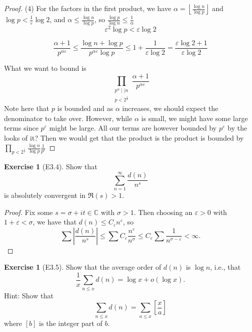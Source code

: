 \documentclass[reqno]{amsart}
\theoremstyle{definition}
\newtheorem{exercise}[theorem]{Exercise}
\theoremstyle{remark}
\begin{document}
\begin{proof}
    (4) For the factors in the first product, we have
    $\alpha = \left\lfloor \frac{\log n}{\log p}
    \right\rfloor$ and
    $\log p < \frac{1}{\varepsilon} \log 2$, and
    $\alpha \le \frac{\log n}{\log p}$, so
    $\frac{\log p}{\log n} \le \frac{1}{\alpha}$
    \[
    \varepsilon^2 \log p < \varepsilon \log 2
    \] 


    \[
        \frac{\alpha+1}{p^{\alpha \varepsilon}}
        \le \frac{\log n +\log p}{p^{\alpha \varepsilon} \log p}
        \le 1 + \frac{1}{\varepsilon \log 2} = 
        \frac{\varepsilon \log 2 + 1}{\varepsilon \log 2}
    \] 

    What we want to bound is
    \[
\prod_{\substack{p^{\alpha} \mid  \mid n \\ p <
    2^{\frac{1}{\varepsilon}}}}
\frac{\alpha+1}{p^{\alpha \varepsilon}}
\] 
Note here that $p$ is bounded and
as $\alpha$ increases, we should expect the denominator to
take over. However, while $\alpha$ is small,
we might have some large terms since $p^{\varepsilon}$ might
be large. All our terms are however bounded by
$p^{\varepsilon}$ by the looks of it? Then we
would get that the product is
the product is bounded by
$\prod_{p < 2^{\frac{1}{\varepsilon}}} 
\frac{\log n}{\log p} \frac{1}{p^{\varepsilon}}$


\end{proof}

\begin{exercise}[E3.4]
    Show that
    \[
    \sum_{n=1}^{\infty} \frac{d(n)}{n^{s}}
    \] 
    is absolutely convergent in
    $\Re (s) > 1$.
\end{exercise}

\begin{proof}
    Fix some $s = \sigma + it \in \mathbb{C}$ with
    $\sigma > 1$. Then choosing an $\varepsilon > 0$ with
    $1 + \varepsilon < \sigma$, we have that
    $d(n) \le C_{\varepsilon} n^{\varepsilon}$, so
    \[
    \sum \left| \frac{d(n)}{n^{s}} \right| 
    \le \sum C_{\varepsilon} \frac{n^{\varepsilon}}{n^{\sigma}}
    \le C_{\varepsilon} \sum \frac{1}{n^{\sigma - \varepsilon}} < 
    \infty.
    \] 
\end{proof}

\begin{exercise}[E3.5]
    Show that the average order of
    $d(n)$ is $\log n$, i.e., that
    \[
    \frac{1}{x} \sum_{n \le x} d(n) = \log x +
    o\left( \log x \right) .
    \] 
    Hint: Show that
    \[
    \sum_{n \le x} d(n) = \sum_{a \le x}
    \left[ \frac{x}{a} \right] 
    \] 
    where $\left[ b \right] $ is the integer
    part of $b$.
\end{exercise}
\end{document}
